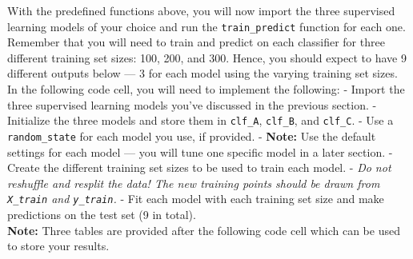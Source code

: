 \documentclass{ctexart}
\begin{document}
With the predefined functions above, you will now import the three
supervised learning models of your choice and run the
\texttt{train\_predict} function for each one. Remember that you will
need to train and predict on each classifier for three different
training set sizes: 100, 200, and 300. Hence, you should expect to have
9 different outputs below --- 3 for each model using the varying
training set sizes. In the following code cell, you will need to
implement the following: - Import the three supervised learning models
you've discussed in the previous section. - Initialize the three models
and store them in \texttt{clf\_A}, \texttt{clf\_B}, and \texttt{clf\_C}.
- Use a \texttt{random\_state} for each model you use, if provided. -
\textbf{Note:} Use the default settings for each model --- you will tune
one specific model in a later section. - Create the different training
set sizes to be used to train each model. - \emph{Do not reshuffle and
resplit the data! The new training points should be drawn from
\texttt{X\_train} and \texttt{y\_train}.} - Fit each model with each
training set size and make predictions on the test set (9 in total).\\
\textbf{Note:} Three tables are provided after the following code cell
which can be used to store your results.
\end{document}
